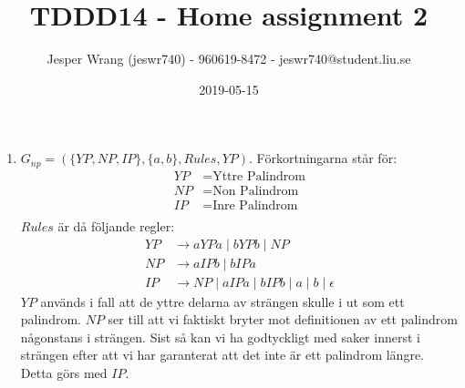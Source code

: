 \documentclass{article}
\title{TDDD14 - Home assignment 2}
\author{Jesper Wrang (jeswr740) - 960619-8472 - jeswr740@student.liu.se}
\date{2019-05-15}
\begin{document}
\maketitle

\section{}

\begin{enumerate}[label=(\alph*)]
    \item 
$G_{np} = (\{YP, NP, IP\}, \{a, b\}, Rules, YP)$. Förkortningarna står för:
\begin{align*}
    YP &= \text{Yttre Palindrom} \\
    NP &= \text{Non Palindrom} \\
    IP &= \text{Inre Palindrom} \\
\end{align*}
$Rules$ är då följande regler: 
\begin{align*}
YP & \to aYPa \mid bYPb \mid NP \\
NP & \to aIPb \mid bIPa \\
IP & \to NP \mid aIPa \mid bIPb \mid a \mid  b \mid \epsilon
\end{align*}
$YP$ används i fall att de yttre delarna av strängen skulle i ut som ett palindrom. $NP$ ser till att vi faktiskt bryter mot definitionen av ett palindrom någonstans i strängen. Sist så kan vi ha godtyckligt med saker innerst i strängen efter att vi har garanterat att det inte är ett palindrom längre. Detta görs med $IP$.


\end{enumerate}
\end{document}
